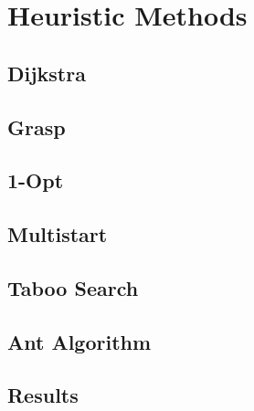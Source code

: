 
\chapter{Heuristic Methods}
\label{chp:5-Heuristic}


\section{Dijkstra}

\section{Grasp}

\section{1-Opt}

\section{Multistart}

\section{Taboo Search}

\section{Ant Algorithm}

\section{Results}



